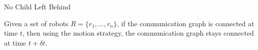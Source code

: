 \begin{frame}{No Child Left Behind}
  \begin{theorem}
    Given a set of robots $R =\{r_1, \ldots, r_n\}$, if the
    communication graph is connected at time $t$, then using the motion
    strategy, the communication graph stays connected at time $t+\delta{t}$.
  \end{theorem}
\end{frame}